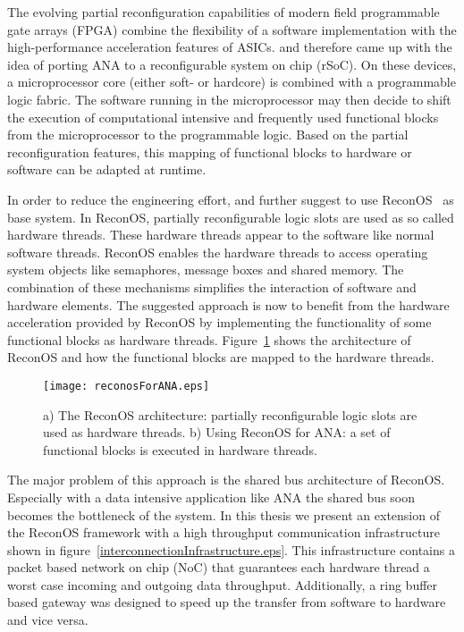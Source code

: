 The evolving partial reconfiguration capabilities of modern field programmable gate arrays (FPGA) combine the flexibility of a software implementation with the high-performance acceleration features of ASICs. \cite{towardsAdaptiveNetworkingForEmbeddedDevices} and \cite{reconfigurableNodesForFutureNetworks} therefore came up with the idea of porting ANA to a reconfigurable system on chip (rSoC). On these devices, a microprocessor core (either soft- or hardcore)  is combined with a programmable logic fabric. The software running in the microprocessor may then decide to shift the execution of computational intensive and frequently used functional blocks from the microprocessor to the programmable logic. Based on the partial reconfiguration features, this mapping of functional blocks to hardware or software can be adapted at runtime.

In order to reduce the engineering effort, \cite{towardsAdaptiveNetworkingForEmbeddedDevices} and \cite{reconfigurableNodesForFutureNetworks} further suggest to use ReconOS~\cite{reconos} as base system. In ReconOS, partially reconfigurable logic slots are used as so called hardware threads. These hardware threads appear to the software like normal software threads. ReconOS enables the hardware threads to access operating system objects like semaphores, message boxes and shared memory. The combination of these mechanisms simplifies the interaction of software and hardware elements. The suggested approach is now to benefit from the hardware acceleration provided by ReconOS by implementing the functionality of some functional blocks as hardware threads. Figure~\ref{reconosForAna.eps} shows the architecture of ReconOS and how the functional blocks are mapped to the hardware threads.

\begin{figure}
  \begin{center}
		 \texttt{[image: reconosForANA.eps]}
  \caption{a) The ReconOS architecture: partially reconfigurable logic slots are used as hardware threads. b) Using ReconOS for ANA: a set of functional blocks is executed in hardware threads.}
  \label{reconosForAna.eps}
  \end{center}
\end{figure}
The major problem of this approach is the shared bus architecture of ReconOS. Especially with a data intensive application like ANA the shared bus soon becomes the bottleneck of the system. In this thesis we present an extension of the ReconOS framework with a high throughput communication infrastructure shown in figure~\ref{interconnectionInfrastructure.eps}. This infrastructure contains a packet based network on chip (NoC) that guarantees each hardware thread a worst case incoming and outgoing data throughput. Additionally, a ring buffer based gateway was designed to speed up the transfer from software to hardware and vice versa.

